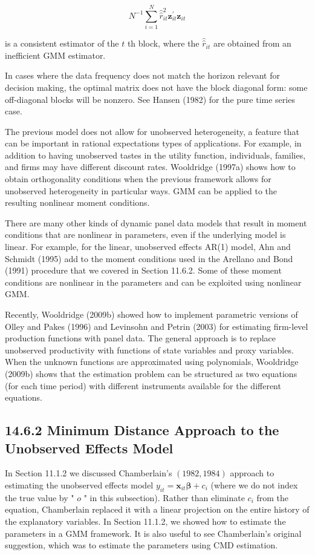 \documentclass[10pt]{article}
\begin{document}
\begin{equation*}
N^{-1} \sum_{i=1}^{N} \hat{\hat{r}}_{i t}^{2} \mathbf{z}_{i t}^{\prime} \mathbf{z}_{i t} \tag{14.77}
\end{equation*}


is a consistent estimator of the $t$ th block, where the $\hat{\hat{r}}_{i t}$ are obtained from an inefficient GMM estimator.

In cases where the data frequency does not match the horizon relevant for decision making, the optimal matrix does not have the block diagonal form: some off-diagonal blocks will be nonzero. See Hansen (1982) for the pure time series case.

The previous model does not allow for unobserved heterogeneity, a feature that can be important in rational expectations types of applications. For example, in addition to having unobserved tastes in the utility function, individuals, families, and firms may have different discount rates. Wooldridge (1997a) shows how to obtain orthogonality conditions when the previous framework allows for unobserved heterogeneity in particular ways. GMM can be applied to the resulting nonlinear moment conditions.

There are many other kinds of dynamic panel data models that result in moment conditions that are nonlinear in parameters, even if the underlying model is linear. For example, for the linear, unobserved effects AR(1) model, Ahn and Schmidt (1995) add to the moment conditions used in the Arellano and Bond (1991) procedure that we covered in Section 11.6.2. Some of these moment conditions are nonlinear in the parameters and can be exploited using nonlinear GMM.

Recently, Wooldridge (2009b) showed how to implement parametric versions of Olley and Pakes (1996) and Levinsohn and Petrin (2003) for estimating firm-level production functions with panel data. The general approach is to replace unobserved productivity with functions of state variables and proxy variables. When the unknown functions are approximated using polynomials, Wooldridge (2009b) shows that the estimation problem can be structured as two equations (for each time period) with different instruments available for the different equations.

\subsection*{14.6.2 Minimum Distance Approach to the Unobserved Effects Model}
In Section 11.1.2 we discussed Chamberlain's $(1982,1984)$ approach to estimating the unobserved effects model $y_{i t}=\mathbf{x}_{i t} \boldsymbol{\beta}+c_{i}$ (where we do not index the true value by " $o$ " in this subsection). Rather than eliminate $c_{i}$ from the equation, Chamberlain replaced it with a linear projection on the entire history of the explanatory variables. In Section 11.1.2, we showed how to estimate the parameters in a GMM framework. It is also useful to see Chamberlain's original suggestion, which was to estimate the parameters using CMD estimation.
\end{document}

